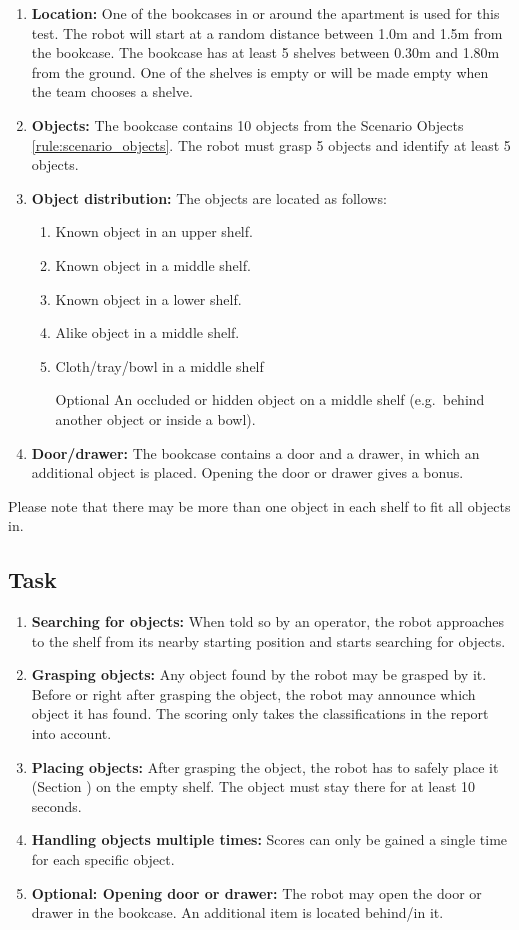 \begin{enumerate}
\item \textbf{Location:} One of the bookcases in or around the apartment is used for this test. The robot will start at a random distance between 1.0m and 1.5m from the bookcase.
The bookcase has at least 5 shelves between 0.30m and 1.80m from the ground. One of the shelves is empty or will be made empty when the team chooses a shelve.
\item \textbf{Objects:} The bookcase contains 10 objects from the Scenario Objects \ref{rule:scenario_objects}.
  The robot must grasp 5 objects and identify at least 5 objects. 
\item \textbf{Object distribution:} The objects are located as follows:
\begin{enumerate}
\item Known object in an upper shelf.
\item Known object in a middle shelf.
\item Known object in a lower shelf.
\item Alike object in a middle shelf.
\item Cloth/tray/bowl in a middle shelf
\item[Optional] An occluded or hidden object on a middle shelf (e.g.~behind another object or inside a bowl).
\end{enumerate}
\item \textbf{Door/drawer:} The bookcase contains a door and a drawer, in which an additional object is placed. Opening the door or drawer gives a bonus. 
\end{enumerate}

Please note that there may be more than one object in each shelf to fit all objects in.

\subsection{Task}
\begin{enumerate}
\item \textbf{Searching for objects:} When told so by an operator, the robot approaches to the shelf from its nearby starting position and starts searching for objects.
\item \textbf{Grasping objects:} Any object found by the robot may be grasped by it. Before or right after grasping the object, the robot may announce which object it has found. The scoring only takes the classifications in the report into account. 
\item \textbf{Placing objects:} After grasping the object, the robot has to safely place it (Section ) on the empty shelf. 
  The object must stay there for at least 10 seconds.
\item \textbf{Handling objects multiple times:} Scores can only be gained a single time for each specific object.
\item \textbf{Optional: Opening door or drawer:} The robot may open the door or drawer in the bookcase. An additional item is located behind/in it. 
\end{enumerate}

